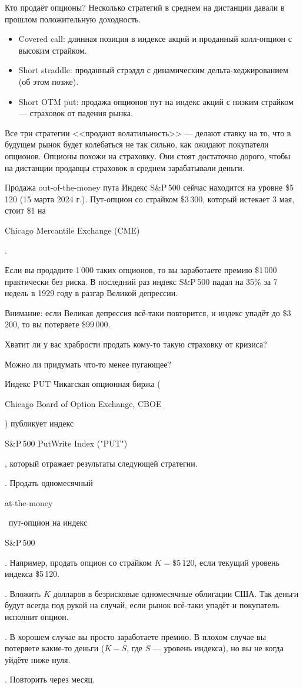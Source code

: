 \documentclass{beamer}
\newcommand{\en}[1]{\begin{otherlanguage}{english}#1\end{otherlanguage}}
\begin{document}
\begin{frame}{Кто продаёт опционы?}
\justify
Несколько стратегий в среднем на дистанции давали в прошлом положительную доходность.

\justify
\begin{itemize}
\justifying
\item Covered call: длинная позиция в индексе акций и проданный колл-опцион с высоким страйком.
\item Short straddle: проданный стрэддл с динамическим дельта-хеджированием (об этом позже).
\item Short OTM put: продажа опционов пут на индекс акций с низким страйком --- страховок от падения рынка.
\end{itemize}

\justify
Все три стратегии <<продают волатильность>> --- делают ставку на то, что в будущем рынок будет колебаться не так сильно, как ожидают покупатели опционов. Опционы похожи на страховку. Они стоят достаточно дорого, чтобы на дистанции продавцы страховок в среднем зарабатывали деньги.
\end{frame}



\begin{frame}{Продажа out-of-the-money пута}
\justify
Индекс S\&P\,500 сейчас находится на уровне \$5\,120 (15 марта 2024 г.). Пут-опцион со страйком \$3\,300, который истекает 3 мая, стоит \$1 на \en{Chicago Mercantile Exchange (CME)}.

\justify
Если вы продадите 1\,000 таких опционов, то вы заработаете премию \$1\,000 практически без риска. В последний раз индекс S\&P\,500 падал на 35\% за 7 недель в 1929 году в разгар Великой депрессии.

\justify
Внимание: если Великая депрессия всё-таки повторится, и индекс упадёт до \$3\,200, то вы потеряете \$99\,000.

\justify
Хватит ли у вас храбрости продать кому-то такую страховку от кризиса?

\justify
Можно ли придумать что-то менее пугающее?
\end{frame}



\begin{frame}{Индекс PUT}
\justify
Чикагская опционная биржа (\en{Chicago Board of Option Exchange, CBOE}) публикует индекс \en{S\&P\,500 PutWrite Index ("PUT")}, который отражает результаты следующей стратегии.

. Продать одномесячный \en{at-the-money}\ пут-опцион на индекс \en{S\&P\,500}. Например, продать опцион со страйком $K=\$5\,120$, если текущий уровень индекса \$5\,120.

. Вложить $K$ долларов в безрисковые одномесячные облигации США. Так деньги будут всегда под рукой на случай, если рынок всё-таки упадёт и покупатель исполнит опцион.

. В хорошем случае вы просто заработаете премию. В плохом случае вы потеряете какие-то деньги ($K-S$, где $S$ --- уровень индекса), но вы не когда уйдёте ниже нуля.

. Повторить через месяц.
\end{frame}
\end{document}
